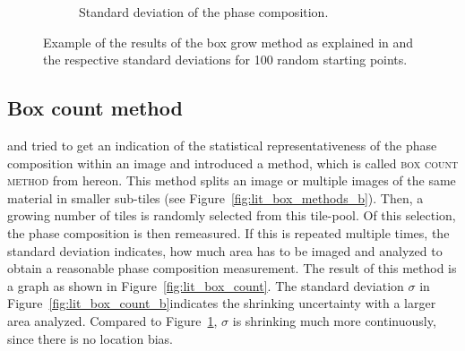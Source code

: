 \begin{figure}[H]
\begin{subfigure}[t]{0.49\linewidth}
      \caption{Standard deviation of the phase composition.}
      \label{fig:lit_box_growth_b}
    \end{subfigure}
    \caption{Example of the results of the box grow method as explained in \cite{bosl.1998,kameda.2006} and the respective standard deviations for 100 random starting points.}
    \label{fig:lit_box_growth}
\end{figure}


\subsection{Box count method} %

\textcite{mouret.2001} and \textcite{hlavacek.2015} tried to get an indication of the statistical representativeness of the phase composition within an image and introduced a method, which is called \textsc{box count method} from hereon.
This method splits an image or multiple images of the same material in smaller sub-tiles (see Figure~\ref{fig:lit_box_methods_b}).
Then, a growing number of tiles is randomly selected from this tile-pool.
Of this selection, the phase composition is then remeasured.
If this is repeated multiple times, the standard deviation indicates, how much area has to be imaged and analyzed to obtain a reasonable phase composition measurement.
The result of this method is a graph as shown in Figure~\ref{fig:lit_box_count}.
The standard deviation $\sigma$ in Figure~\ref{fig:lit_box_count_b}indicates the shrinking uncertainty with a larger area analyzed. Compared to Figure~\ref{fig:lit_box_growth_b}, $\sigma$ is shrinking much more continuously, since there is no location bias.

